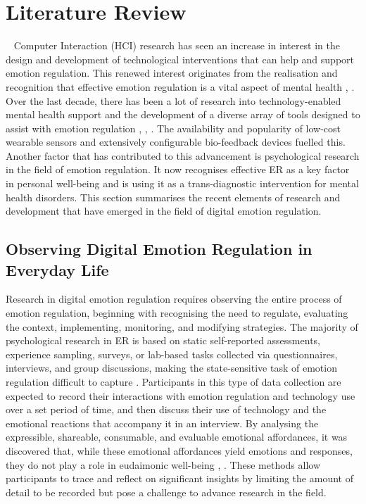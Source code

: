 \section{Literature Review}~\label{sec:literature}
Computer Interaction (HCI) research has seen an increase in interest in the design and development of technological interventions that can help and support emotion regulation. This renewed interest originates from the realisation and recognition that effective emotion regulation is a vital aspect of mental health \cite{gross2015emotion}, \cite{davidson1998affective}. Over the last decade, there has been a lot of research into technology-enabled mental health support and the development of a diverse array of tools designed to assist with emotion regulation \cite{wadley2020digital}, \cite{smith2022digital}, \cite{slovak2022designing}. The availability and popularity of low-cost wearable sensors and extensively configurable bio-feedback devices fuelled this. Another factor that has contributed to this advancement is psychological research in the field of emotion regulation. It now recognises effective ER as a key factor in personal well-being and is using it as a trans-diagnostic intervention for mental health disorders. This section summarises the recent elements of research and development that have emerged in the field of digital emotion regulation. 

\subsection{Observing Digital Emotion Regulation in Everyday Life}

Research in digital emotion regulation requires observing the entire process of emotion regulation, beginning with recognising the need to regulate, evaluating the context, implementing, monitoring, and modifying strategies. The majority of psychological research in ER is based on static self-reported assessments, experience sampling, surveys, or lab-based tasks collected via questionnaires, interviews, and group discussions, making the state-sensitive task of emotion regulation difficult to capture \cite{wadley2022future}. Participants in this type of data collection are expected to record their interactions with emotion regulation and technology use over a set period of time, and then discuss their use of technology and the emotional reactions that accompany it in an interview.  By analysing the expressible, shareable, consumable, and evaluable emotional affordances, it was discovered that, while these emotional affordances yield emotions and responses, they do not play a role in eudaimonic well-being \cite{tag2021retrospective}, \cite{steinert2022emotions}. These methods allow participants to trace and reflect on significant insights by limiting the amount of detail to be recorded but pose a challenge to advance research in the field.


